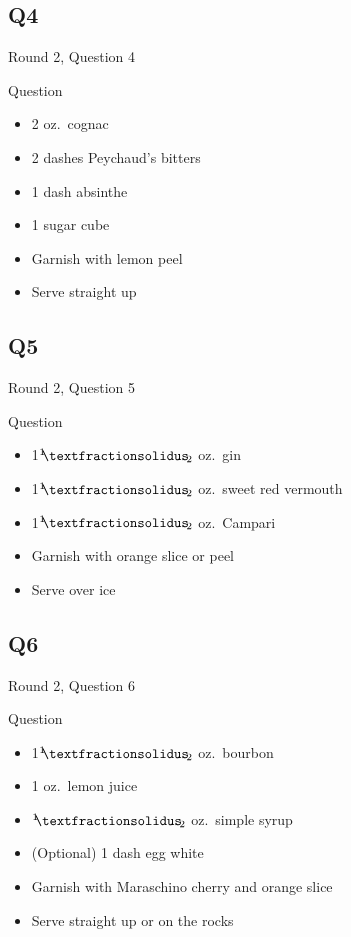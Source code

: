 \documentclass[11pt]{beamer}
\begin{document}
\subsection*{Q4}
\begin{frame}[t]{Round 2, Question 4}
\begin{block}{Question}
\begin{itemize}
\item 2 oz.\ cognac
\item 2 dashes Peychaud's bitters
\item 1 dash absinthe
\item 1 sugar cube
\item Garnish with lemon peel
\item Serve straight up
\end{itemize}
\end{block}
\end{frame}
\subsection*{Q5}
\begin{frame}[t]{Round 2, Question 5}
\begin{block}{Question}
\begin{itemize}
\item 1\({}^1{\mskip -5mu⁄\mskip -3mu}_2\) oz.\ gin
\item 1\({}^1{\mskip -5mu⁄\mskip -3mu}_2\) oz.\ sweet red vermouth
\item 1\({}^1{\mskip -5mu⁄\mskip -3mu}_2\) oz.\ Campari
\item Garnish with orange slice or peel
\item Serve over ice
\end{itemize}
\end{block}
\end{frame}
\subsection*{Q6}
\begin{frame}[t]{Round 2, Question 6}
\begin{block}{Question}
\begin{itemize}
\item 1\({}^1{\mskip -5mu⁄\mskip -3mu}_2\) oz.\ bourbon
\item 1 oz.\ lemon juice
\item \({}^1{\mskip -5mu⁄\mskip -3mu}_2\) oz.\ simple syrup
\item (Optional) 1 dash egg white
\item Garnish with Maraschino cherry and orange slice
\item Serve straight up or on the rocks
\end{itemize}
\end{block}
\end{frame}
\end{document}
